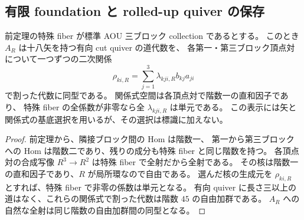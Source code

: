 \subsection{有限 foundation と rolled-up quiver の保存}

\begin{lemma}
\label{lem:relative-aou-foundation}
前定理の特殊 fiber が標準 AOU 三ブロック collection であるとする。
このとき $A_R$ は十八矢を持つ有向 cut quiver の道代数を、
各第一・第三ブロック頂点対について一つずつの二次関係
\[
 \rho_{ki,R}=\sum_{j=1}^3\lambda_{kji,R}b_{kj}a_{ji}
\]
で割った代数に同型である。
関係式空間は各頂点対で階数一の直和因子であり、
特殊 fiber の全係数が非零なら全 $\lambda_{kji,R}$ は単元である。
この表示には矢と関係式の基底選択を用いるが、その選択は標識に加えない。
\end{lemma}
\begin{proof}
前定理から、隣接ブロック間の Hom は階数一、
第一から第三ブロックへの Hom は階数二であり、残りの成分も特殊 fiber と同じ階数を持つ。
各頂点対の合成写像 $R^3\to R^2$ は特殊 fiber で全射だから全射である。
その核は階数一の直和因子であり、$R$ が局所環なので自由である。
選んだ核の生成元を $\rho_{ki,R}$ とすれば、特殊 fiber で非零の係数は単元となる。
有向 quiver に長さ三以上の道はなく、これらの関係式で割った代数は階数 $45$ の自由加群である。
$A_R$ への自然な全射は同じ階数の自由加群間の同型となる。
\end{proof}

